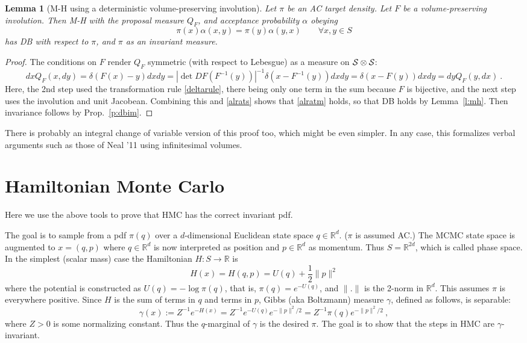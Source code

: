 \documentclass[10pt]{article}
\newcommand{\be}{\begin{equation}}
\newcommand{\ee}{\end{equation}}
\newcommand{\R}{\mathbb{R}}
\newtheorem{lem}[thm]{Lemma}
\newcommand{\al}{\alpha}
\begin{document}
\begin{lem}[M-H using a deterministic volume-preserving involution]
  Let $\pi$ be an AC target density.
  Let $F$ be a volume-preserving involution.
  Then M-H with the proposal measure $Q_F$, and acceptance
  probability $\al$ obeying
  \be
  \pi(x) \al(x,y) = \pi(y) \al(y,x)   \qquad \forall x,y \in S
  \label{alrats}
  \ee
  has DB with respect to $\pi$, and $\pi$ as an invariant measure.
  \label{l:mhmap}
\end{lem}
\begin{proof}
  The conditions on $F$ render $Q_F$ symmetric (with respect to Lebesgue)
  as a measure on $\cal S \otimes \cal S$:
  $$
  dx Q_F(x,dy) = \delta(F(x)-y) dxdy =
  |\det DF(F^{-1}(y))|^{-1} \delta(x - F^{-1}(y)) dxdy =
  \delta(x-F(y)) dxdy =
  dy Q_F(y,dx)~.
  $$
  Here, the 2nd step used the transformation rule \eqref{deltarule}, there being
  only one term in the sum because $F$ is bijective, and
  the next step uses the involution and unit Jacobean.
  Combining this and \eqref{alrats} shows that \eqref{alratm} holds,
  so that DB holds by Lemma~\ref{l:mh}.
  Then invariance follows by Prop.~\ref{p:dbim}.
\end{proof}

There is probably an integral change of variable version of this proof too,
which might be even simpler.
In any case, this formalizes verbal arguments such as those of Neal '11 using infinitesimal
volumes.


\section{Hamiltonian Monte Carlo}

Here we use the above tools to prove that HMC has the correct invariant pdf.

The goal is to sample from a pdf $\pi(q)$ over a $d$-dimensional
Euclidean state space $q\in \R^d$. ($\pi$ is assumed AC.)
The MCMC state space is augmented to $x = (q,p)$ where $q\in \R^d$ is now interpreted as position and $p\in\R^d$ as momentum. Thus $S = \R^{2d}$, which
is called phase space.
In the simplest (scalar mass) case the Hamiltonian $H:S \to \R$ is
$$
H(x) = H(q,p) = U(q) + \frac{1}{2}\|p\|^2
$$
where the potential is constructed as $U(q) = -\log \pi(q)$, that is, $\pi(q) = e^{-U(q)}$,
and $\|.\|$ is the 2-norm in $\R^d$.
This assumes $\pi$ is everywhere positive.
Since $H$ is the sum of terms in $q$ and terms in $p$,
Gibbs (aka Boltzmann) measure $\gamma$, defined as follows, is separable:
\be
\gamma(x) := Z^{-1} e^{-H(x)} = Z^{-1} e^{-U(q)} e^{-\|p\|^2/2} = Z^{-1} \pi(q) e^{-\|p\|^2/2}~,
\label{Gibbs}
\ee
where $Z>0$ is some normalizing constant.
Thus the $q$-marginal of $\gamma$ is the desired $\pi$.
The goal is to show that the steps in HMC are $\gamma$-invariant.
\end{document}
